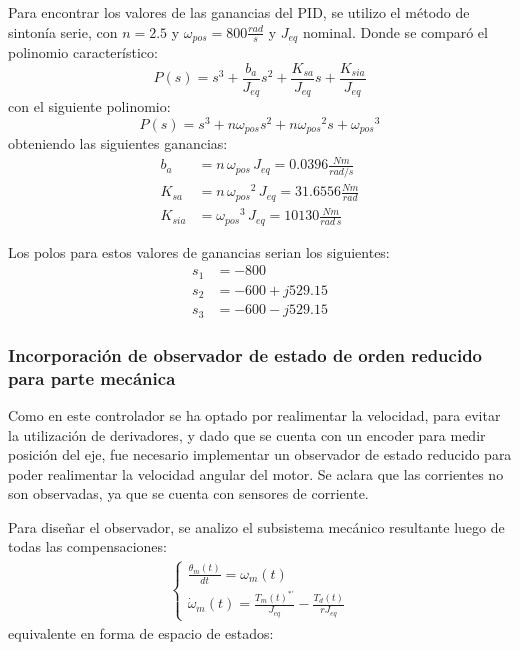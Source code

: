 \documentclass[a4paper, 10pt, onecolumn,journal]{ieeeconf}
\begin{document}
Para encontrar los valores de las ganancias del PID, se utilizo el método de sintonía serie, con $n=2.5$ y $\omega_{pos}=800\frac{rad}{s}$ y $J_{eq}$ nominal. Donde se comparó el polinomio característico:
\begin{equation}
	P(s) =  s^3 + \frac{b_a}{J_{eq}} s^2 + \frac{K_{sa}}{J_{eq}} s + \frac{K_{sia}}{J_{eq}} 
\end{equation}
con el siguiente polinomio:
\begin{equation}
	P(s) =  s^3 + n \omega_{pos} s^2 + n {\omega_{pos}}^2 s + {\omega_{pos}}^3 
\end{equation}
obteniendo las siguientes ganancias:
\begin{align}
	b_a &=  n \, \omega_{pos} \, J_{eq}= 0.0396 \frac{Nm}{rad/s} \\
	K_{sa} &=  n \, {\omega_{pos}}^2 \, J_{eq}= 31.6556 \frac{Nm}{rad}\\
	K_{sia} &= {\omega_{pos}}^3 \, J_{eq}= 10130 \frac{Nm}{rad \, s}
\end{align}

Los polos para estos valores de ganancias serian los siguientes:
\begin{align}
	s_1 &= -800 \\
	s_2 &=  -600 + j 529.15\\
	s_3 &=  -600 - j 529.15
\end{align}

\subsubsection{\textbf{Incorporación de observador de estado de orden reducido para parte mecánica}}
Como en este controlador se ha optado por realimentar la velocidad, para evitar la utilización de derivadores, y dado que se cuenta con un encoder para medir posición del eje, fue necesario implementar un observador de estado reducido para poder realimentar la velocidad angular del motor. Se aclara que las corrientes no son observadas, ya que se cuenta con sensores de corriente.

Para diseñar el observador, se analizo el subsistema mecánico resultante luego de todas las compensaciones:
\begin{align}
	\begin{cases}
		\frac{\theta_m(t)}{dt} ={\omega}_m(t)\\
		\dot{\omega}_m(t) = \frac{{T_m(t)}^{*'}}{ J_{eq}}- \frac{T_d(t)}{r J_{eq}}
	\end{cases}\label{ecuacion de subsistema mecanico compensado}
\end{align}
 equivalente en forma de espacio de estados:
 
\end{document}
